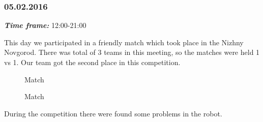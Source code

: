\subsubsection{05.02.2016}
\textit{\textbf{Time frame:}} 12:00-21:00 

This day we participated in a friendly match which took place in the Nizhny Novgorod. There was total of 3 teams in this meeting, so the matches were held 1 vs 1. Our team got the second place in this competition. 

\begin{figure}[H]
	\begin{minipage}[h]{0.47\linewidth}
		\caption{Match}
	\end{minipage}
	\hfill
	\begin{minipage}[h]{0.47\linewidth}
		\caption{Match}
	\end{minipage}
\end{figure}

During the competition there were found some problems in the robot. 

